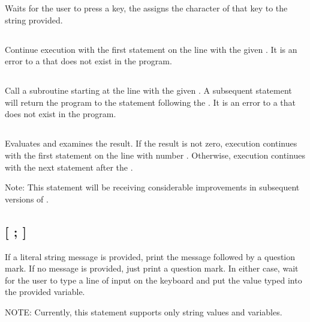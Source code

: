 \documentclass{report}
\begin{document}
    Waits for the user to press a key, the assigns the character of that key to the string  provided.

    \subsection*{ }

    Continue execution with the first statement on the line with the given .
    It is an error to  a  that does not exist in the program.

    \subsection*{ }

    Call a subroutine starting at the line with the given .
    A subsequent  statement will return the program to the statement
    following the .
    It is an error to  a  that does not exist in the program.

    \subsection*{   }

    Evaluates  and examines the result.
    If the result is not zero, execution continues with the first statement on the line with number .
    Otherwise, execution continues with the next statement after the .

    Note: This statement will be receiving considerable improvements in subsequent versions of \BASIC.

    \subsection*{ [ ; ] }

    If a literal string message is provided, print the message followed by a question mark.
    If no message is provided, just print a question mark.
    In either case, wait for the user to type a line of input on the keyboard and
    put the value typed into the provided variable.

    NOTE: Currently, this statement supports only string values and variables.
\end{document}
